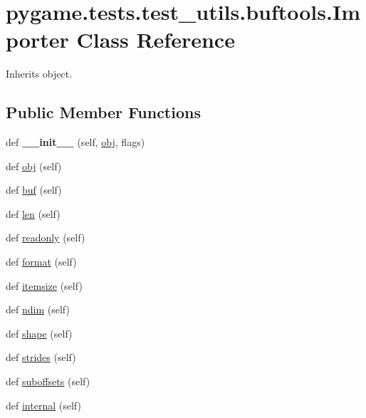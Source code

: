 \hypertarget{classpygame_1_1tests_1_1test__utils_1_1buftools_1_1_importer}{}\section{pygame.\+tests.\+test\+\_\+utils.\+buftools.\+Importer Class Reference}
\label{classpygame_1_1tests_1_1test__utils_1_1buftools_1_1_importer}


Inherits object.

\subsection*{Public Member Functions}
\begin{DoxyCompactItemize}
\item 
\mbox{\label{classpygame_1_1tests_1_1test__utils_1_1buftools_1_1_importer_a3e9523aa037ba8d9d0f43a1c07ab48a7}} 
def {\bfseries \+\_\+\+\_\+init\+\_\+\+\_\+} (self, \hyperlink{classpygame_1_1tests_1_1test__utils_1_1buftools_1_1_importer_af8af4b70c316fe17ec019f0c55ad74d5}{obj}, flags)
\item 
def \hyperlink{classpygame_1_1tests_1_1test__utils_1_1buftools_1_1_importer_af8af4b70c316fe17ec019f0c55ad74d5}{obj} (self)
\item 
def \hyperlink{classpygame_1_1tests_1_1test__utils_1_1buftools_1_1_importer_ab0cae2f8dc5038d615cc76bebb09adca}{buf} (self)
\item 
def \hyperlink{classpygame_1_1tests_1_1test__utils_1_1buftools_1_1_importer_afcd83b75714d2d134c84f960e2ea24f3}{len} (self)
\item 
def \hyperlink{classpygame_1_1tests_1_1test__utils_1_1buftools_1_1_importer_ae8ce8bf79daabc25567671fcff4ea8c8}{readonly} (self)
\item 
def \hyperlink{classpygame_1_1tests_1_1test__utils_1_1buftools_1_1_importer_a0616a9962fab24dcbf698472b4de9e00}{format} (self)
\item 
def \hyperlink{classpygame_1_1tests_1_1test__utils_1_1buftools_1_1_importer_a4272665ebaec95da798eac1b69f0d072}{itemsize} (self)
\item 
def \hyperlink{classpygame_1_1tests_1_1test__utils_1_1buftools_1_1_importer_a64fd3de833dc068afb0188bd35822e36}{ndim} (self)
\item 
def \hyperlink{classpygame_1_1tests_1_1test__utils_1_1buftools_1_1_importer_a8b323b0d1aebc874f38e31a85b09be75}{shape} (self)
\item 
def \hyperlink{classpygame_1_1tests_1_1test__utils_1_1buftools_1_1_importer_aceb9e53e55defbbd1c8bedcf85b75d76}{strides} (self)
\item 
def \hyperlink{classpygame_1_1tests_1_1test__utils_1_1buftools_1_1_importer_a36338cb975d85aca51418050ce75fdbb}{suboffsets} (self)
\item 
def \hyperlink{classpygame_1_1tests_1_1test__utils_1_1buftools_1_1_importer_adb3eb9153107bdad5a6ecdb263b18cc4}{internal} (self)
\end{DoxyCompactItemize}


